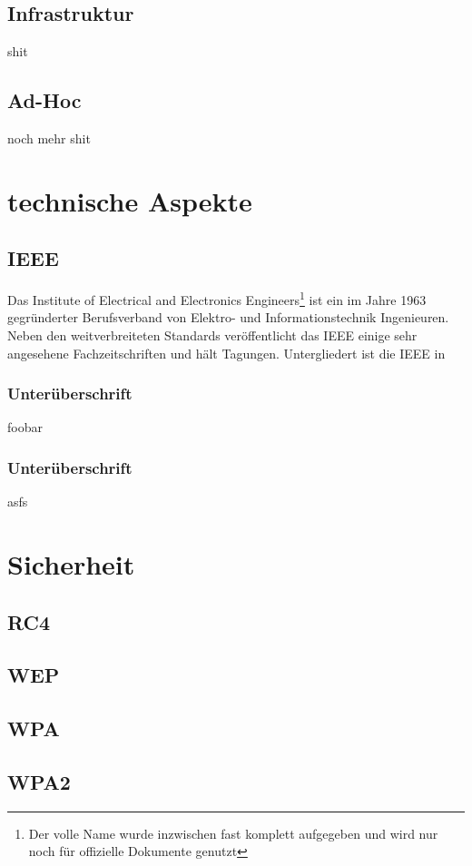 \documentclass[a4paper,13pt]{scrartcl}
\begin{document}
\subsection{Infrastruktur}

shit

\subsection{Ad-Hoc}

noch mehr shit

\section{technische Aspekte}
\subsection{IEEE}
Das Institute of Electrical and Electronics Engineers\footnote{Der volle Name wurde inzwischen fast komplett aufgegeben und wird nur noch für offizielle Dokumente genutzt} ist ein im Jahre 1963 gegründerter Berufsverband von Elektro- und Informationstechnik Ingenieuren. Neben den weitverbreiteten Standards veröffentlicht das IEEE einige sehr angesehene Fachzeitschriften und hält Tagungen. 
Untergliedert ist die IEEE in 
\subsubsection{Unterüberschrift}
foobar
\subsubsection{Unterüberschrift}
asfs
\section{Sicherheit}
\subsection{RC4}
\subsection{WEP}
\subsection{WPA}
\subsection{WPA2}
\end{document}
